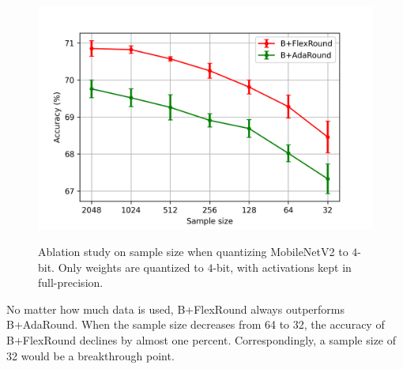 \documentclass{article}
\theoremstyle{plain}
\theoremstyle{definition}
\theoremstyle{remark}
\begin{document}
\begin{figure}[H]
    \centering
    \subfigure
    {
        \includegraphics[width=0.7\linewidth]{figures/sample_size.png}
        \label{fig:sample_size}
    }
    \caption{Ablation study on sample size when quantizing MobileNetV2 to $4$-bit. Only weights are quantized to $4$-bit, with activations kept in full-precision.}
    \label{fig:sample_size}
\end{figure}

No matter how much data is used, B+FlexRound always outperforms B+AdaRound. When the sample size decreases from 64 to 32, the accuracy of B+FlexRound declines by almost one percent. Correspondingly, a sample size of 32 would be a breakthrough point.


\end{document}
